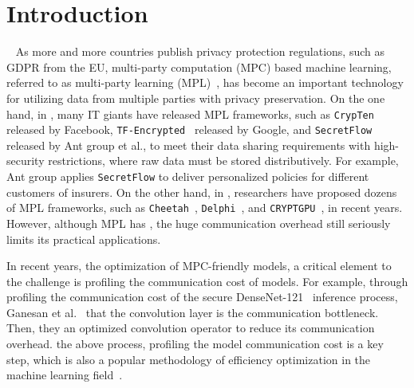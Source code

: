 \section{Introduction}~\label{sec:intro}
As more and more countries publish privacy protection regulations, such as GDPR from the EU, multi-party computation (MPC) based machine learning, referred to as multi-party learning (MPL)~\cite{song2020sok,10.1145/3548606.3560697}, has become an important technology for utilizing data from multiple parties with privacy preservation. On the one hand, in , many IT giants have released MPL frameworks, such as \texttt{CrypTen}~\cite{crypten2020} released by Facebook, \texttt{TF-Encrypted}~\cite{TF-Encrypted} released by Google, and \texttt{SecretFlow}~\cite{secretflow} released by Ant group et al., to meet their data sharing requirements with high-security restrictions, where raw data must be stored distributively. For example, Ant group applies \texttt{SecretFlow} to deliver personalized policies for different customers of insurers. On the other hand, in , researchers have proposed dozens of MPL frameworks, such as \texttt{Cheetah}~\cite{Cheetah}, \texttt{Delphi}~\cite{244032},  and \texttt{CRYPTGPU}~\cite{cryptGPU}, in recent years. However, although MPL has , the huge communication overhead still seriously limits its practical applications.

In recent years,   the optimization of MPC-friendly models, a critical element to  the challenge is profiling the communication cost of models. For example, through profiling the communication cost of the secure DenseNet-121~\cite{Huang_2017_CVPR} inference process, Ganesan et al.~\cite{ganesan2022efficient}  that the convolution layer is the communication bottleneck. Then, they  an optimized convolution operator to reduce its communication overhead.  the above process, profiling the model communication cost is a key step, which is also a popular methodology of efficiency optimization in the machine learning field~\cite{10.1145/3379337.3415890, NEURIPS2022_4fc81f4c}. 


